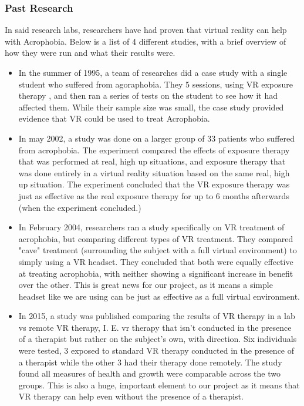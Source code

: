 \documentclass[a4paper,10pt]{article}
\begin{document}
\subsubsection{Past Research}
In said research labs, researchers have had proven that virtual reality can help with Acrophobia.  Below is a list of 4 different studies, with a brief overview of how they were run and what their results were.
\begin{itemize}
	\item In the summer of 1995, a team of researches did a case study with a single student who suffered from agoraphobia.  They 5 sessions, using VR exposure therapy , and then ran a series of tests on the student to see how it had affected them.  While their sample size was small, the case study provided evidence that VR could be used to treat Acrophobia.\cite{phobiaOne}
	\item In may 2002, a study was done on a larger group of 33 patients who suffered from acrophobia.  The experiment compared the effects of exposure therapy that was performed at real, high up situations, and exposure therapy that was done entirely in a virtual reality situation based on the same real, high up situation.  The experiment concluded that the VR exposure therapy was just as effective as the real exposure therapy for up to 6 months afterwards (when the experiment concluded.)\cite{phobiaTwo}
	\item In February 2004, researchers ran a study specifically on VR treatment of acrophobia, but comparing different types of VR treatment. They compared "cave" treatment (surrounding the subject with a full virtual environment) to simply using a VR headset.   They concluded that both were equally effective at treating acrophobia, with neither showing a significant increase in benefit over the other.  This is great news for our project, as it means a simple headset like we are using can be just as effective as a full virtual environment.\cite{phobiaThree}
	\item In 2015, a study was published comparing the results of VR therapy in a lab vs remote VR therapy, I. E. vr therapy that isn't conducted in the presence of a therapist but rather on the subject's own, with direction.  Six individuals were tested, 3 exposed to standard VR therapy conducted in the presence of a therapist while the other 3 had their therapy done remotely.  The study found all measures of health and growth were comparable across the two groups. This is also a huge, important element to our project as it means that VR therapy can help even without the presence of a therapist.\cite{phobiaFour}
\end{itemize}
\end{document}
